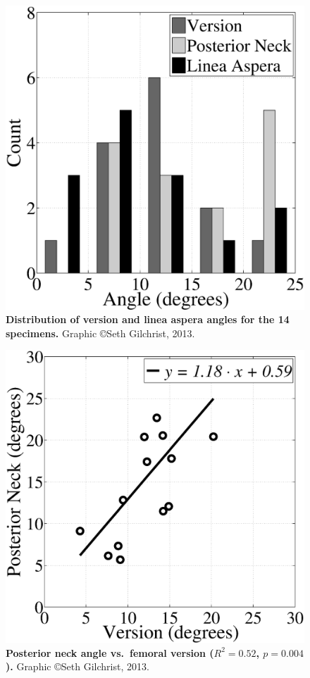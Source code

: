 \begin{figure}
\centering
\includegraphics[width=0.7\linewidth]{./appendixVersion/figures/Distributions}
\caption[Linea aspera, version and posterior neck angle histogram]{\textbf{Distribution of version and linea aspera angles for the 14 specimens.} Graphic \copyright Seth Gilchrist, 2013.}
\label{fig:version_Distributions}
\end{figure}

\begin{figure}
\centering
\includegraphics[width=0.7\linewidth]{./appendixVersion/figures/VersionVSPN}
\caption[Posterior neck \acs*{vs} version]{\textbf{Posterior neck angle vs.\ femoral version ($R^2 = 0.52$, $p = 0.004$).} Graphic \copyright Seth Gilchrist, 2013.}
\label{fig:version_VersionVSPN}
\end{figure}

